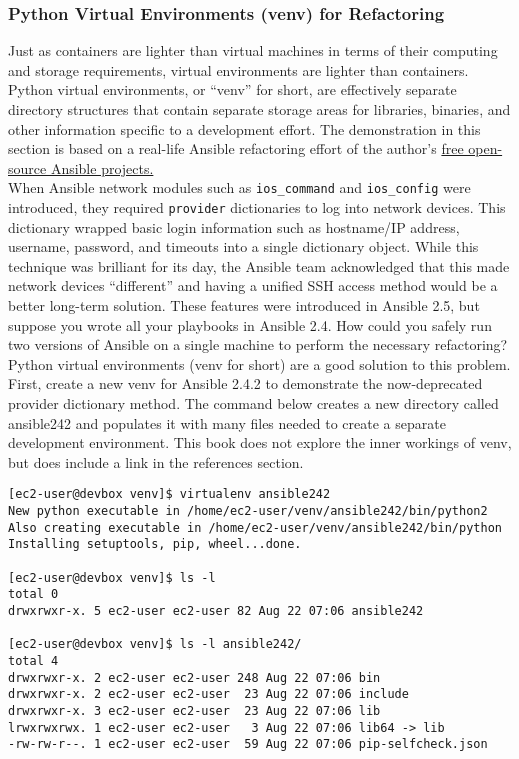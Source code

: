 \subsubsection{Python Virtual Environments (venv) for Refactoring}
Just as containers are lighter than virtual machines in terms of their
computing and storage requirements, virtual environments are lighter than
containers. Python virtual environments, or ``venv'' for short, are effectively
separate directory structures that contain separate storage areas for
libraries, binaries, and other information specific to a development effort.
The demonstration in this section is based on a real-life Ansible refactoring
effort of the author's
\href{https://github.com/nickrusso42518/}{free open-source Ansible projects.} \\

When Ansible network modules such as \verb|ios_command| and \verb|ios_config| were
introduced, they required \verb|provider| dictionaries to log into network devices.
This dictionary wrapped basic login information such as hostname/IP address,
username, password, and timeouts into a single dictionary object. While this
technique was brilliant for its day, the Ansible team acknowledged that this
made network devices ``different'' and having a unified SSH access method would
be a better long-term solution. These features were introduced in Ansible 2.5,
but suppose you wrote all your playbooks in Ansible 2.4. How could you safely
run two versions of Ansible on a single machine to perform the necessary
refactoring? Python virtual environments (venv for short) are a good solution
to this problem. \\

First, create a new venv for Ansible 2.4.2 to demonstrate the now-deprecated
provider dictionary method. The command below creates a new directory called
ansible242 and populates it with many files needed to create a separate
development environment. This book does not explore the inner workings of
venv, but does include a link in the references section.

\begin{verbatim}
[ec2-user@devbox venv]$ virtualenv ansible242
New python executable in /home/ec2-user/venv/ansible242/bin/python2
Also creating executable in /home/ec2-user/venv/ansible242/bin/python
Installing setuptools, pip, wheel...done.

[ec2-user@devbox venv]$ ls -l
total 0
drwxrwxr-x. 5 ec2-user ec2-user 82 Aug 22 07:06 ansible242

[ec2-user@devbox venv]$ ls -l ansible242/
total 4
drwxrwxr-x. 2 ec2-user ec2-user 248 Aug 22 07:06 bin
drwxrwxr-x. 2 ec2-user ec2-user  23 Aug 22 07:06 include
drwxrwxr-x. 3 ec2-user ec2-user  23 Aug 22 07:06 lib
lrwxrwxrwx. 1 ec2-user ec2-user   3 Aug 22 07:06 lib64 -> lib
-rw-rw-r--. 1 ec2-user ec2-user  59 Aug 22 07:06 pip-selfcheck.json
\end{verbatim}

